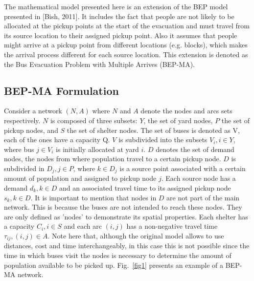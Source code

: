 \documentclass[conference]{IEEEtran}
\begin{document}
The mathematical model presented here is an extension of the BEP model presented in [Bish, 2011]. It includes the fact that people are not likely to be allocated at the pickup points at the start of the evacuation and must travel from its source location to their assigned pickup point. Also it assumes that people might arrive at a pickup point from different locations (e.g. blocks), which makes the arrival process different for each source location. This extension is denoted as the Bus Evacuation Problem with Multiple Arrives (BEP-MA).

\subsection{BEP-MA Formulation}

Consider a network $(N, A)$ where $N$ and $A$ denote the nodes and arcs sets respectively. $N$ is composed of three subsets: $Y$, the set of yard nodes, $P$ the set of pickup nodes, and $S$ the set of shelter nodes. The set of buses is denoted as V, each of the ones have a capacity Q. $V$ is subdivided into the subsets $V_{i}, i \in Y$, where bus $j \in V_{i}$ is initially allocated at yard $i$. $D$ denotes the set of demand nodes, the nodes from where population travel to a certain pickup node. $D$ is subdivided in $D_{j}, j \in P$, where $k \in D_{j}$ is a source point associated with a certain amount of population and assigned to pickup node $j$. Each source node has a demand $d_{k}, k \in D$ and an associated travel time to its assigned pickup node $s_{k}, k \in D$. It is important to mention that nodes in $D$ are not part of the main network. This is because the buses are not intended to reach these nodes. They are only defined as 'nodes' to demonstrate its spatial properties. Each shelter has a capacity $C_{i}, i \in S$ and each arc $(i, j)$ has a non-negative travel time $\tau_{ij}, (i, j) \in A$. Note here that, although the original model allows to use distances, cost and time interchangeably, in this case this is not possible since the time in which buses visit the nodes is necessary to determine the amount of population available to be picked up. Fig.~\ref{fig1} presents an example of a BEP-MA network.
\end{document}
